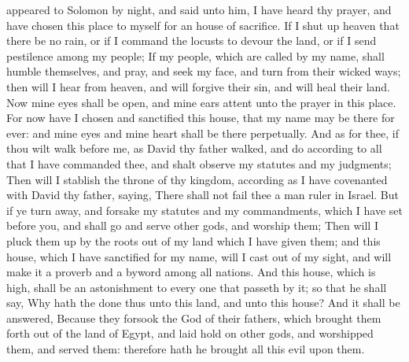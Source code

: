 {{}
appeared to
Solomon by
night, and
said unto him, I have
heard thy
prayer, and have
chosen this
place to myself for an
house of
sacrifice.
If I shut
up
heaven that there be no
rain, or if I
command the
locusts to
devour the
land, or if I
send
pestilence among my
people;
If my
people, which are
called by my
name, shall
humble themselves, and
pray, and
seek my
face, and
turn from their
wicked
ways; then will I
hear from
heaven, and will
forgive their
sin, and will
heal their
land.
Now mine
eyes shall be
open, and mine
ears
attent unto the
prayer
{} in this
place.
For now have I
chosen and
sanctified this
house, that my
name may be there
for
ever: and mine
eyes and mine
heart shall be there
perpetually.
And as for thee, if thou wilt
walk
before me, as
David thy
father
walked, and
do according to all that I have
commanded thee, and shalt
observe my
statutes and my
judgments;
Then will I
stablish the
throne of thy
kingdom, according as I have
covenanted with
David thy
father,
saying, There shall not
fail thee a
man
{}
ruler in
Israel.
But if ye turn
away, and
forsake my
statutes and my
commandments, which I have
set
before you, and shall
go and
serve
other
gods, and
worship them;
Then will I pluck them up by the
roots out of my
land which I have
given them; and this
house, which I have
sanctified for my
name, will I cast
out of my
sight, and will
make it
{} a
proverb and a
byword among all
nations.
And this
house, which is
high, shall be an
astonishment to every one that
passeth by it; so that he shall
say, Why hath the
{}
done thus unto this
land, and unto this
house?
And it shall be
answered, Because they
forsook the
{}
God of their
fathers, which brought them
forth out of the
land of
Egypt, and laid
hold on
other
gods, and
worshipped them, and
served them: therefore hath he
brought all this
evil upon them.

}
